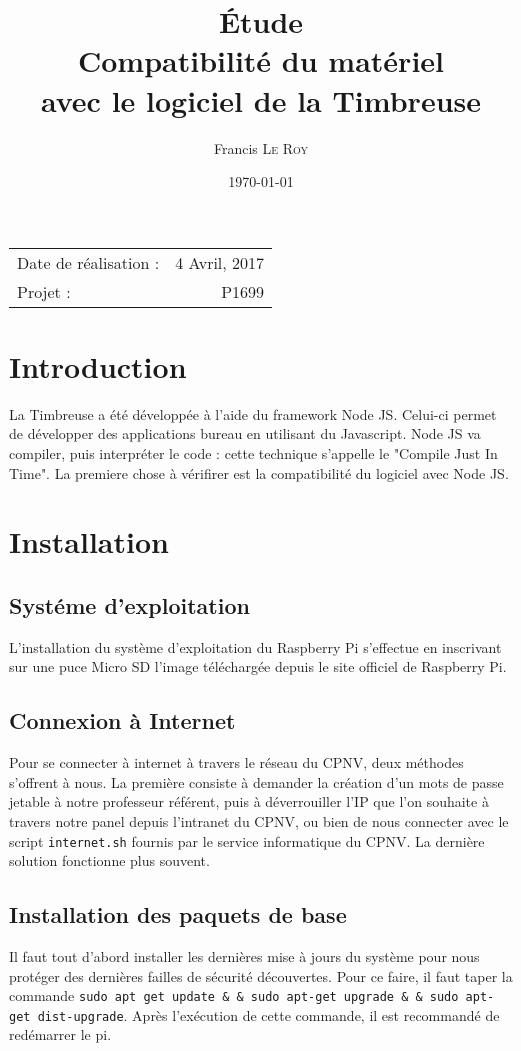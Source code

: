 \documentclass[10pt,a4paper,onecolumn]{article}
\title{Étude \\ Compatibilité du matériel \\ avec le logiciel de la Timbreuse}
\author{Francis \textsc{Le Roy}}
\date{\today}
\begin{document}
\maketitle
\thispagestyle{fancy}

\begin{center}
\begin{tabular}{l r}
Date de réalisation : & 4 Avril, 2017 \\
Projet : & P1699 \\
\end{tabular}
\end{center}


\section{Introduction}
La Timbreuse a été développée à l'aide du framework Node JS. Celui-ci permet de développer des applications bureau en utilisant du Javascript.
Node JS va compiler, puis interpréter le code : cette technique s'appelle le "Compile Just In Time". La premiere chose à vérifirer est la
compatibilité du logiciel avec Node JS.
\section{Installation}
\subsection{Systéme d'exploitation}
L'installation du système d'exploitation du Raspberry Pi s'effectue en inscrivant sur une puce Micro SD l'image téléchargée depuis le site officiel
de Raspberry Pi.
\subsection{Connexion à Internet}
Pour se connecter à internet à travers le réseau du CPNV, deux méthodes s'offrent à nous. La première consiste à demander la création d'un mots de passe
jetable à notre professeur référent, puis à déverrouiller l'IP que l'on souhaite à travers notre panel depuis l'intranet du CPNV, ou bien de nous connecter
avec le script \texttt{internet.sh} fournis par le service informatique du CPNV. La dernière solution fonctionne plus souvent.

\subsection{Installation des paquets de base}
Il faut tout d'abord installer les dernières mise à jours du système pour nous protéger des dernières failles de sécurité découvertes.
Pour ce faire, il faut taper la commande \texttt{sudo apt\- get update \& \&  sudo apt-get upgrade \& \&  sudo apt-get dist-upgrade}. Après l'exécution de cette commande,
il est recommandé de redémarrer le pi.
\end{document}
